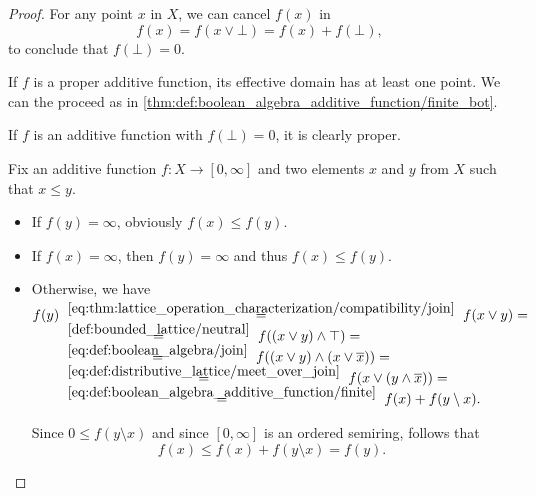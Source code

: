 \begin{proof}
   For any point \( x \) in \( X \), we can cancel \( f(x) \) in
  \begin{equation*}
    f(x) = f(x \vee \bot) = f(x) + f(\bot),
  \end{equation*}
  to conclude that \( f(\bot) = 0 \).

  \SufficiencySubProof* If \( f \) is a proper additive function, its effective domain has at least one point. We can the proceed as in \cref{thm:def:boolean_algebra_additive_function/finite_bot}.

  \NecessitySubProof* If \( f \) is an additive function with \( f(\bot) = 0 \), it is clearly proper.

   Fix an additive function \( f: X \to [0, \infty] \) and two elements \( x \) and \( y \) from \( X \) such that \( x \leq y \).

  \begin{itemize}
    \item If \( f(y) = \infty \), obviously \( f(x) \leq f(y) \).
    \item If \( f(x) = \infty \), then \( f(y) = \infty \) and thus \( f(x) \leq f(y) \).
    \item Otherwise, we have
    \begin{align*}
      f(y)
      &\reloset {\eqref{eq:thm:lattice_operation_characterization/compatibility/join}} =
      f(x \vee y)
      = \\ &\reloset {\ref{def:bounded_lattice/neutral}} =
      f((x \vee y) \wedge \top)
      = \\ &\reloset {\eqref{eq:def:boolean_algebra/join}} =
      f((x \vee y) \wedge (x \vee \oline x))
      = \\ &\reloset {\eqref{eq:def:distributive_lattice/meet_over_join}} =
      f(x \vee (y \wedge \oline x))
      = \\ &\reloset {\eqref{eq:def:boolean_algebra_additive_function/finite}} =
      f(x) + f(y \setminus x).
    \end{align*}

    Since \( 0 \leq f(y \setminus x) \) and since \( [0, \infty] \) is an ordered semiring, follows that
    \begin{equation*}
      f(x) \leq f(x) + f(y \setminus x) = f(y).
    \end{equation*}
  \end{itemize}
\end{proof}

